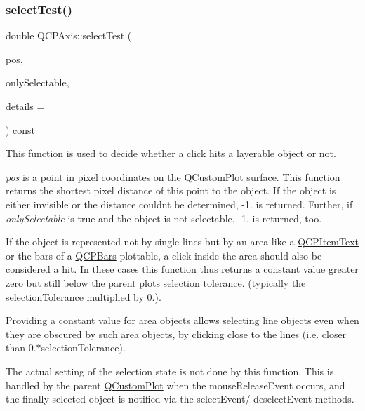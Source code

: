 \subsubsection{\texorpdfstring{selectTest()}{selectTest()}}
{\footnotesize\ttfamily double Q\+C\+P\+Axis\+::select\+Test (\begin{DoxyParamCaption}\item[{const Q\+PointF \&}]{pos,  }\item[{bool}]{only\+Selectable,  }\item[{Q\+Variant $\ast$}]{details = {} }\end{DoxyParamCaption}) const\hspace{0.3cm}{\ttfamily [virtual]}}

This function is used to decide whether a click hits a layerable object or not.

{\itshape pos} is a point in pixel coordinates on the \mbox{\hyperlink{class_q_custom_plot}{Q\+Custom\+Plot}} surface. This function returns the shortest pixel distance of this point to the object. If the object is either invisible or the distance couldn\textquotesingle{}t be determined, -\/1. is returned. Further, if {\itshape only\+Selectable} is true and the object is not selectable, -\/1. is returned, too.

If the object is represented not by single lines but by an area like a \mbox{\hyperlink{class_q_c_p_item_text}{Q\+C\+P\+Item\+Text}} or the bars of a \mbox{\hyperlink{class_q_c_p_bars}{Q\+C\+P\+Bars}} plottable, a click inside the area should also be considered a hit. In these cases this function thus returns a constant value greater zero but still below the parent plot\textquotesingle{}s selection tolerance. (typically the selection\+Tolerance multiplied by 0.).

Providing a constant value for area objects allows selecting line objects even when they are obscured by such area objects, by clicking close to the lines (i.\+e. closer than 0.$\ast$selection\+Tolerance).

The actual setting of the selection state is not done by this function. This is handled by the parent \mbox{\hyperlink{class_q_custom_plot}{Q\+Custom\+Plot}} when the mouse\+Release\+Event occurs, and the finally selected object is notified via the select\+Event/ deselect\+Event methods.

